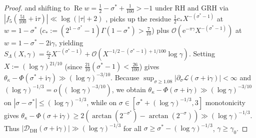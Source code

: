 \documentclass[11pt,a4paper,reqno]{amsart}
\theoremstyle{definition}
\theoremstyle{remark}
\numberwithin{equation}{section}
\newcommand{\ii}{\mathrm{i}}
\newcommand{\ee}{\mathrm{e}}
\DeclareMathOperator{\Reop}{Re}
\begin{document}
\begin{proof}
and shifting to $\Reop w = \frac{1}{2} - \sigma^* + \frac{1}{100} > -1$ under RH and GRH via $|f_5(\frac{51}{100} + \ii\tau)| \ll \log(|\tau| + 2)$ \cite[Thm.~14.5]{titchmarsh1986}, \cite[Thm.~13.13]{montgomeryvaughan2007} picks up the residue $\frac{1}{2}c_* X^{-(\sigma^*-1)}$ at $w = 1 - \sigma^*$ ($c_* := (2^{1-\sigma^*} - 1)\Gamma(1 - \sigma^*) > \frac{7}{10}$) plus $\mathcal{O}(\ee^{-\pi\gamma}X^{-(\sigma^*-1)})$ at $w = 1 - \sigma^* - 2\ii\gamma$, yielding $S_\Lambda(X,\gamma) = \frac{c_*}{2}X^{-(\sigma^*-1)} + \mathcal{O}(X^{-1/2 - (\sigma^*-1) + 1/100}\log\gamma)$. Setting $X := (\log\gamma)^{21/10}$ (since $\frac{21}{10}(\sigma^* - 1) < \frac{26}{100}$) gives $\theta_\kappa - \Phi(\sigma^* + \ii\gamma) \gg (\log\gamma)^{-3/10}$. Because $\sup_{\sigma \ge 1.08}|\partial_\sigma\mathcal{L}(\sigma + \ii\gamma)| < \infty$ and $(\log\gamma)^{-1/3} = o((\log\gamma)^{-3/10})$, we obtain $\theta_\kappa - \Phi(\sigma + \ii\gamma) \gg (\log\gamma)^{-3/10}$ on $|\sigma - \sigma^*| \le (\log\gamma)^{-1/3}$, while on $\sigma \in [\sigma^* + (\log\gamma)^{-1/3}, 3]$ monotonicity gives $\theta_\kappa - \Phi(\sigma + \ii\gamma) \ge 2(\arctan(2^{-\sigma^*}) - \arctan(2^{-\sigma})) \gg (\log\gamma)^{-1/3}$. Thus $|\mathcal{D}_{\mathrm{DH}}(\sigma + \ii\gamma)| \gg (\log\gamma)^{-1/3}$ for all $\sigma \ge \sigma^* - (\log\gamma)^{-1/3}$, $\gamma \ge \gamma_0$.


\end{proof}
\end{document}
